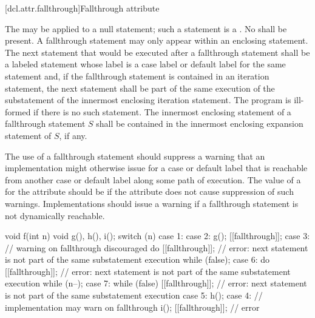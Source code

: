 [dcl.attr.fallthrough]{Fallthrough attribute}

\pnum
The  
may be applied to a null statement;
such a statement is a .
No  shall be present.
A fallthrough statement may only appear within
an enclosing  statement.
The next statement that would be executed after a fallthrough statement
shall be a labeled statement whose label is a case label or
default label for the same  statement and,
if the fallthrough statement is contained in an iteration statement,
the next statement shall be part of the same execution of
the substatement of the innermost enclosing iteration statement.
The program is ill-formed if there is no such statement.
The innermost enclosing  statement
of a fallthrough statement $S$ shall be contained in
the innermost enclosing expansion statement of $S$, if any.

\pnum
\recommended
The use of a fallthrough statement should suppress
a warning that an implementation might otherwise issue
for a case or default label that is reachable
from another case or default label along some path of execution.
The value of
a  for the  attribute
should be 
if the attribute does not cause suppression of such warnings.
Implementations should issue a warning
if a fallthrough statement is not dynamically reachable.

\pnum
\begin{example}
\begin{codeblock}
void f(int n) {
  void g(), h(), i();
  switch (n) {
  case 1:
  case 2:
    g();
    [[fallthrough]];
  case 3:                       // warning on fallthrough discouraged
    do {
      [[fallthrough]];          // error: next statement is not part of the same substatement execution
    } while (false);
  case 6:
    do {
      [[fallthrough]];          // error: next statement is not part of the same substatement execution
    } while (n--);
  case 7:
    while (false) {
      [[fallthrough]];          // error: next statement is not part of the same substatement execution
    }
  case 5:
    h();
  case 4:                       // implementation may warn on fallthrough
    i();
    [[fallthrough]];            // error
  }
}
\end{codeblock}
\end{example}

